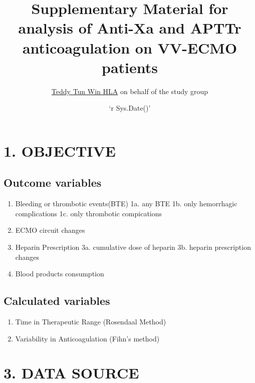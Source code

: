 \documentclass[
]{article}
\title{Supplementary Material for analysis of Anti-Xa and APTTr
anticoagulation on VV-ECMO patients}
\author{\href{https://github.com/teddyhla}{Teddy Tun Win HLA} on behalf
of the study group}
\date{`r Sys.Date()'}
\providecommand{\tightlist}{%
  \setlength{\itemsep}{0pt}\setlength{\parskip}{0pt}}
\begin{document}
\maketitle

{
\setcounter{tocdepth}{3}
\tableofcontents
}
\hypertarget{objective}{%
\section{1. OBJECTIVE}\label{objective}}

\hypertarget{outcome-variables}{%
\subsection{Outcome variables}\label{outcome-variables}}

\begin{enumerate}
\def\labelenumi{\arabic{enumi}.}
\item
  Bleeding or thrombotic events(BTE) 1a. any BTE 1b. only hemorrhagic
  complications 1c. only thrombotic compications
\item
  ECMO circuit changes
\item
  Heparin Prescription 3a. cumulative dose of heparin 3b. heparin
  prescription changes
\item
  Blood products consumption
\end{enumerate}

\hypertarget{calculated-variables}{%
\subsection{Calculated variables}\label{calculated-variables}}

\begin{enumerate}
\def\labelenumi{\arabic{enumi}.}
\tightlist
\item
  Time in Therapeutic Range (Rosendaal Method)
\item
  Variability in Anticoagulation (Fihn's method)
\end{enumerate}

\hypertarget{section}{%
\section{}\label{section}}

\hypertarget{data-source}{%
\section{3. DATA SOURCE}\label{data-source}}
\end{document}
